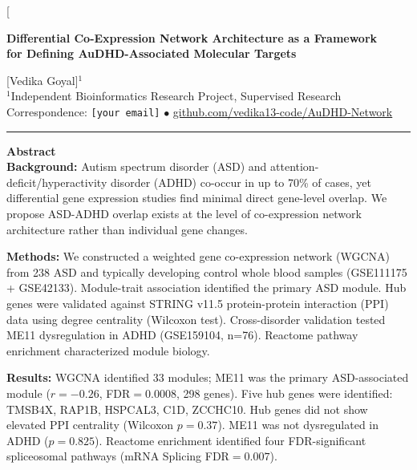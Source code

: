 \documentclass[10pt,twocolumn]{article}
\begin{document}
\twocolumn[{%
\begin{@twocolumnfalse}

\begin{center}
  {\LARGE\bfseries\color{navy}
    Differential Co-Expression Network Architecture as a Framework\\
    for Defining AuDHD-Associated Molecular Targets
  \par}
  \vspace{0.5em}

  {\large [Vedika Goyal]$^{1}$}\\[0.3em]
  {\small\color{textgrey}
    $^{1}$Independent Bioinformatics Research Project, Supervised Research\\
    Correspondence: \texttt{[your email]} $\bullet$
    \url{github.com/vedika13-code/AuDHD-Network}
  }

  \vspace{0.8em}
  \noindent\color{navy}\rule{\linewidth}{1.5pt}
  \vspace{0.5em}
\end{center}

\begin{mdframed}[
  backgroundcolor=lgrey,
  linecolor=navy,
  linewidth=1pt,
  innertopmargin=8pt,
  innerbottommargin=8pt,
  innerleftmargin=10pt,
  innerrightmargin=10pt
]
{\color{navy}\bfseries Abstract}\\[4pt]
\small
\textbf{Background:} Autism spectrum disorder (ASD) and attention-deficit/hyperactivity
disorder (ADHD) co-occur in up to 70\% of cases, yet differential gene expression studies
find minimal direct gene-level overlap. We propose ASD-ADHD overlap exists at the level of
co-expression network architecture rather than individual gene changes.

\medskip
\textbf{Methods:} We constructed a weighted gene co-expression network (WGCNA) from 238
ASD and typically developing control whole blood samples (GSE111175 + GSE42133). Module-trait
association identified the primary ASD module. Hub genes were validated against STRING v11.5
protein-protein interaction (PPI) data using degree centrality (Wilcoxon test). Cross-disorder
validation tested ME11 dysregulation in ADHD (GSE159104, n=76). Reactome pathway enrichment
characterized module biology.

\medskip
\textbf{Results:} WGCNA identified 33 modules; ME11 was the primary ASD-associated module
($r=-0.26$, FDR$=0.0008$, 298 genes). Five hub genes were identified: TMSB4X, RAP1B, HSPCAL3,
C1D, ZCCHC10. Hub genes did not show elevated PPI centrality (Wilcoxon $p=0.37$). ME11 was
not dysregulated in ADHD ($p=0.825$). Reactome enrichment identified four FDR-significant
spliceosomal pathways (mRNA Splicing FDR$=0.007$).


\end{mdframed}
\end{@twocolumnfalse}}
\end{document}

